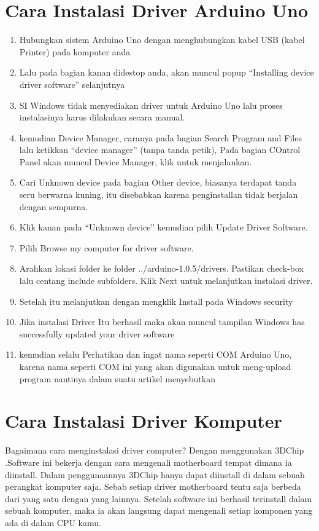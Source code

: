 \section{Cara Instalasi Driver Arduino Uno}
\begin{enumerate}
\item Hubungkan sistem  Arduino Uno dengan menghubungkan kabel USB (kabel Printer) pada komputer anda
\item Lalu pada bagian kanan didestop anda, akan muncul popup “Installing device driver software” selanjutnya
\item SI Windows tidak menyediakan driver untuk Arduino Uno lalu proses instalasinya harus dilakukan secara manual.
\item kemudian Device Manager, caranya pada bagian Search Program and Files lalu ketikkan “device manager” (tanpa tanda petik), Pada bagian COntrol Panel akan muncul Device Manager, klik untuk menjalankan.
\item Cari Unknown device pada bagian Other device, biasanya terdapat tanda seru berwarna kuning, itu disebabkan karena penginstallan tidak berjalan dengan sempurna.
\item Klik kanan pada “Unknown device” kemudian pilih Update Driver Software.
\item Pilih Browse my computer for driver software.
\item Arahkan lokasi folder ke folder ../arduino-1.0.5/drivers. Pastikan check-box lalu centang include subfolders. Klik Next untuk melanjutkan instalasi driver.
\item Setelah itu melanjutkan dengan mengklik Install pada Windows security
\item Jika instalasi Driver Itu berhasil maka akan muncul tampilan Windows has successfully updated your driver software
\item kemudian selalu Perhatikan dan ingat nama seperti COM Arduino Uno, karena nama  seperti COM ini yang akan  digunakan untuk meng-upload program nantinya
dalam suatu artikel menyebutkan \cite{teikari2012inexpensive}
\end{enumerate}

\section{Cara Instalasi Driver Komputer}
Bagaimana cara menginstalasi driver computer? 
Dengan menggunakan 3DChip .Software ini bekerja dengan cara mengenali motherboard tempat dimana ia diinstall. Dalam penggunaannya 3DChip hanya dapat diinstall di dalam sebuah perangkat komputer saja. Sebab setiap driver motherboard tentu saja berbeda dari  yang satu dengan yang lainnya. Setelah software ini berhasil terinstall dalam sebuah komputer, maka ia akan langsung dapat mengenali setiap komponen yang ada di dalam CPU kamu. 

